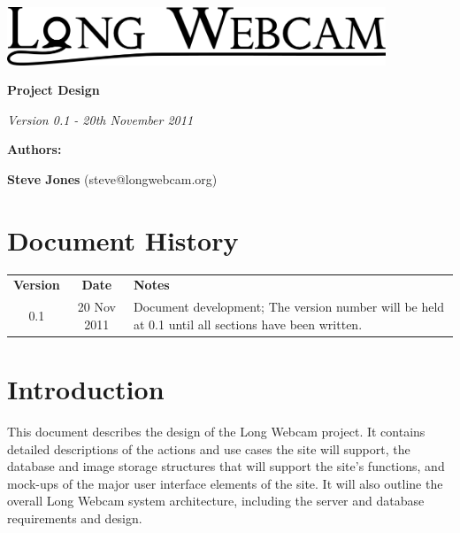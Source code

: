 \documentclass[11pt]{article}
\begin{document}
\begin{titlepage}
\begin{center}

\includegraphics[width=0.85\textwidth]{./Logo_Large-cropped_black.png}

\vspace{3 cm}

\textbf{\Huge{Project Design}}

\vspace{1 cm}

\textit{\large{Version 0.1 - 20th November 2011}}

\vspace{4 cm}

\textbf{\Large{Authors:}}

\textbf{Steve Jones} (steve@longwebcam.org)

\end{center}

\end{titlepage}

\setcounter{tocdepth}{2}
\tableofcontents
\clearpage
{}
\section*{Document History}
\begin{table}[tbhp!]
\begin{tabular}{ c c p{4in} }
\textbf{Version} & \textbf{Date} & \textbf{Notes} \\
0.1 & 20 Nov 2011 & Document development; The version number will be held at 0.1 until all sections have been written. \\
\end{tabular}
\end{table}


\clearpage
{}

\section{Introduction}
This document describes the design of the Long Webcam project. It contains detailed descriptions of the actions and use cases the site will support, the database and image storage structures that will support the site's functions, and mock-ups of the major user interface elements of the site. It will also outline the overall Long Webcam system architecture, including the server and database requirements and design.
\end{document}
